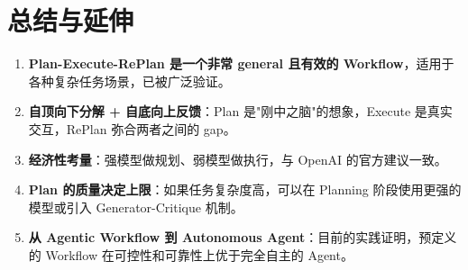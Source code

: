 \section{总结与延伸}

\begin{enumerate}
    \item \textbf{Plan-Execute-RePlan 是一个非常 general 且有效的 Workflow}，适用于各种复杂任务场景，已被广泛验证。
    \item \textbf{自顶向下分解 + 自底向上反馈}：Plan 是"刚中之脑"的想象，Execute 是真实交互，RePlan 弥合两者之间的 gap。
    \item \textbf{经济性考量}：强模型做规划、弱模型做执行，与 OpenAI 的官方建议一致。
    \item \textbf{Plan 的质量决定上限}：如果任务复杂度高，可以在 Planning 阶段使用更强的模型或引入 Generator-Critique 机制。
    \item \textbf{从 Agentic Workflow 到 Autonomous Agent}：目前的实践证明，预定义的 Workflow 在可控性和可靠性上优于完全自主的 Agent。
\end{enumerate}


